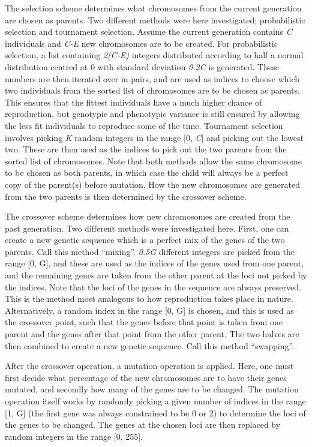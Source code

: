\documentclass[multicolumn, 9pt]{extarticle}
\begin{document}
The selection scheme determines what chromosomes from the current generation are chosen as parents. Two different methods were here investigated; probabilistic selection and tournament selection. Assume the current generation contains \textit{C} individuals and \textit{C-E} new chromosomes are to be created. For probabilistic selection, a list containing \textit{2(C-E)} integers distributed according to half a normal distribution centred at 0 with standard deviation \textit{0.2C} is generated. These numbers are then iterated over in pairs, and are used as indices to choose which two individuals from the sorted list of chromosomes are to be chosen as parents. This ensures that the fittest individuals have a much higher chance of reproduction, but genotypic and phenotypic variance is still ensured by allowing the less fit individuals to reproduce some of the time. Tournament selection involves picking \textit{K} random integers in the range [0, \textit{C}] and picking out the lowest two. These are then used as the indices to pick out the two parents from the sorted list of chromosomes. Note that both methods allow the same chromosome to be chosen as both parents, in which case the child will always be a perfect copy of the parent(s) before mutation. How the new chromosomes are generated from the two parents is then determined by the crossover scheme.

The crossover scheme determines how new chromosomes are created from the past generation. Two different methods were investigated here. First, one can create a new genetic sequence which is a perfect mix of the genes of the two parents. Call this method ``mixing''. \textit{0.5G} different integers are picked from the range [0, G], and these are used as the indices of the genes used from one parent, and the remaining genes are taken from the other parent at the loci not picked by the indices. Note that the loci of the genes in the sequence are always preserved. This is the method most analogous to how reproduction takes place in nature. Alternatively, a random index in the range [0, G] is chosen, and this is used as the crossover point, such that the genes before that point is taken from one parent and the genes after that point from the other parent. The two halves are then combined to create a new genetic sequence. Call this method ``swapping''.

After the crossover operation, a mutation operation is applied. Here, one must first decide what percentage of the new chromosomes are to have their genes mutated, and secondly how many of the genes are to be changed. The mutation operation itself works by randomly picking a given number of indices in the range [1, G] (the first gene was always constrained to be 0 or 2) to determine the loci of the genes to be changed. The genes at the chosen loci are then replaced by random integers in the range [0, 255].
\end{document}
